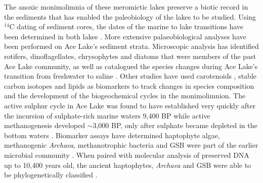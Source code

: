 The anoxic monimolimnia of these meromictic lakes preserve a biotic record in the sediments that has enabled the paleobiology of the lakes to be studied.
Using $^{14}$C dating of sediment cores, the dates of the marine to lake transitions have been determined in both lakes \cite{Bird1991}.
More extensive palaeobiological analyses have been performed on Ace Lake's sediment strata.
Microscopic analysis has identified rotifers, dinoflagellates, chrysophytes and diatoms that were members of the past Ace Lake community, as well as catalogued the species changes during Ace Lake's transition from freshwater to saline \cite{Roberts1999, Swadling2001}.
Other studies have used carotenoids \cite{Hopmans2005, Coolen2006}, stable carbon isotopes \cite{Schouten2001} and lipids \cite{Volkman1986, Volkman1988, Damste2001, Coolen2004a, Coolen2004b} as biomarkers to track changes in species composition and the development of the biogeochemical cycles in the monimolimnion.
The active sulphur cycle in Ace Lake was found to have established very quickly after the incursion of sulphate-rich marine waters 9,400 BP while active methanogenesis developed $\sim$3,000 BP, only after sulphate became depleted in the bottom waters \cite{Coolen2004b, Coolen2006}.
Biomarker assays have determined haptophyte algae, methanogenic \emph{Archaea}, methanotrophic bacteria and \ac{GSB} were part of the earlier microbial community \cite{Schouten2001, Coolen2004a, Coolen2004b, Coolen2006}.
When paired with molecular analysis of preserved \textsc{DNA} up to 10,400 years old, the ancient haptophytes, \emph{Archaea} and \ac{GSB} were able to be phylogenetically classified \cite{Coolen2004a, Coolen2004b, Coolen2006}.

